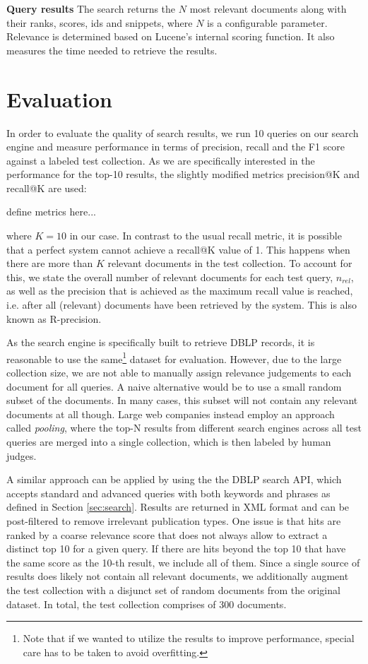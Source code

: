 \documentclass{sig-alternate-05-2015}
\begin{document}
\textbf{Query results} \quad The search returns the $N$ most relevant documents along with their ranks, scores, ids and snippets, where $N$ is a configurable parameter. Relevance is determined based on Lucene's internal scoring function. It also measures the time needed to retrieve the results.

\section{Evaluation}

In order to evaluate the quality of search results, we run 10 queries on our search engine and measure performance in terms of precision, recall and the F1 score against a labeled test collection. As we are specifically interested in the performance for the top-10 results, the slightly modified metrics precision@K and recall@K are used:

define metrics here...

where $K=10$ in our case. In contrast to the usual recall metric, it is possible that a perfect system cannot achieve a recall@K value of 1. This happens when there are more than $K$ relevant documents in the test collection. To account for this, we state the overall number of relevant documents for each test query, $n_{rel}$, as well as the precision that is achieved as the maximum recall value is reached, i.e. after all (relevant) documents have been retrieved by the system. This is also known as R-precision.

As the search engine is specifically built to retrieve DBLP records, it is reasonable to use the same\footnote{Note that if we wanted to utilize the results to improve performance, special care has to be taken to avoid overfitting.} dataset for evaluation. However, due to the large collection size, we are not able to manually assign relevance judgements to each document for all queries. A naive alternative would be to use a small random subset of the documents. In many cases, this subset will not contain any relevant documents at all though. Large web companies instead employ an approach called \emph{pooling}, where the top-N results from different search engines across all test queries are merged into a single collection, which is then labeled by human judges.  

A similar approach can be applied by using the the DBLP search API, which accepts standard and advanced queries with both keywords and phrases as defined in Section \ref{sec:search}. Results are returned in XML format and can be post-filtered to remove irrelevant publication types. One issue is that hits are ranked by a coarse relevance score that does not always allow to extract a distinct top 10 for a given query. If there are hits beyond the top 10 that have the same score as the 10-th result, we include all of them. Since a single source of results does likely not contain all relevant documents, we additionally augment the test collection with a disjunct set of random documents from the original dataset. In total, the test collection comprises of 300 documents.
\end{document}

